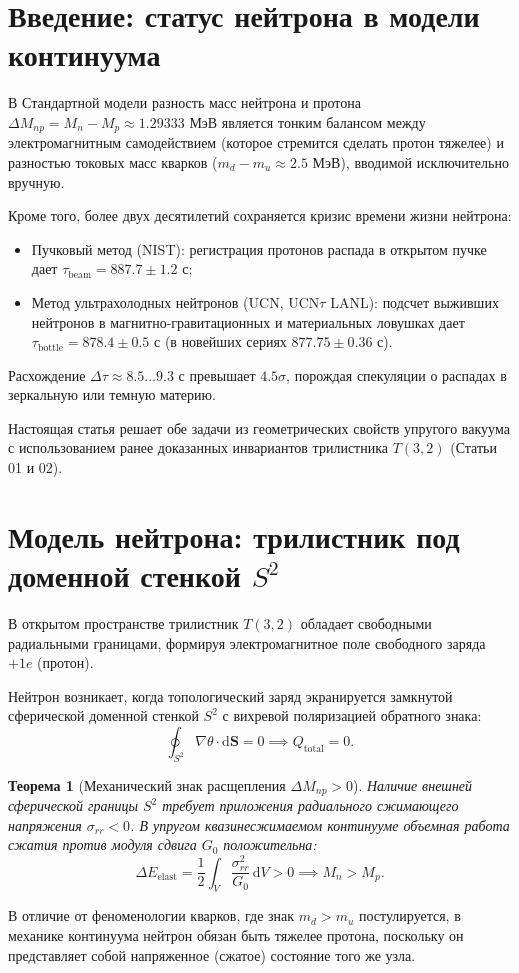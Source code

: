 \documentclass[11pt,a4paper]{article}
\newtheorem{theorem}{Теорема}
\theoremstyle{definition}
\theoremstyle{remark}
\begin{document}
\section{Введение: статус нейтрона в модели континуума}
В Стандартной модели разность масс нейтрона и протона $\Delta M_{np} = M_n - M_p \approx 1.29333\text{ МэВ}$ является тонким балансом между электромагнитным самодействием (которое стремится сделать протон тяжелее) и разностью токовых масс кварков ($m_d - m_u \approx 2.5\text{ МэВ}$), вводимой исключительно вручную. 

Кроме того, более двух десятилетий сохраняется кризис времени жизни нейтрона:
\begin{itemize}
    \item Пучковый метод (NIST): регистрация протонов распада в открытом пучке дает $\tau_{\mathrm{beam}} = 887.7 \pm 1.2\text{ с}$;
    \item Метод ультрахолодных нейтронов (UCN, $\mathrm{UCN}\tau$ LANL): подсчет выживших нейтронов в магнитно-гравитационных и материальных ловушках дает $\tau_{\mathrm{bottle}} = 878.4 \pm 0.5\text{ с}$ (в новейших сериях $877.75 \pm 0.36\text{ с}$).
\end{itemize}
Расхождение $\Delta\tau \approx 8.5\dots 9.3\text{ с}$ превышает $4.5\sigma$, порождая спекуляции о распадах в зеркальную или темную материю.

Настоящая статья решает обе задачи из геометрических свойств упругого вакуума с использованием ранее доказанных инвариантов трилистника $T(3,2)$ (Статьи 01 и 02).

\section{Модель нейтрона: трилистник под доменной стенкой $S^2$}
В открытом пространстве трилистник $T(3,2)$ обладает свободными радиальными границами, формируя электромагнитное поле свободного заряда $+1e$ (протон). 

Нейтрон возникает, когда топологический заряд экранируется замкнутой сферической доменной стенкой $S^2$ с вихревой поляризацией обратного знака:
\begin{equation}
    \oint_{S^2} \nabla \theta \cdot \mathrm{d}\mathbf{S} = 0 \implies Q_{\mathrm{total}} = 0.
\end{equation}

\begin{theorem}[Механический знак расщепления $\Delta M_{np} > 0$]
Наличие внешней сферической границы $S^2$ требует приложения радиального сжимающего напряжения $\sigma_{rr} < 0$. В упругом квазинесжимаемом континууме объемная работа сжатия против модуля сдвига $G_0$ положительна:
\begin{equation}
    \Delta E_{\mathrm{elast}} = \frac{1}{2} \int_{V} \frac{\sigma_{rr}^2}{G_0} \, \mathrm{d}V > 0 \implies M_n > M_p.
\end{equation}
\end{theorem}
В отличие от феноменологии кварков, где знак $m_d > m_u$ постулируется, в механике континуума нейтрон обязан быть тяжелее протона, поскольку он представляет собой напряженное (сжатое) состояние того же узла.
\end{document}
